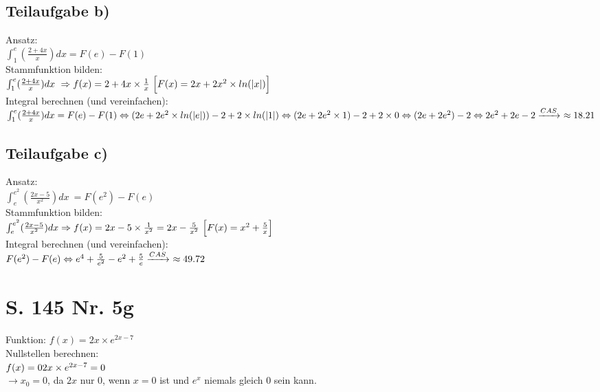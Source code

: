 \documentclass[11pt, a4paper]{report}
\begin{document}
	\section{Teilaufgabe b)}
	Ansatz:
	\\
	$\int_{1}^{e} (\frac{2 + 4x}{x}) dx = F(e) - F(1)$
	\\
	Stammfunktion bilden:
	\\
	$
	\int_{1}^{e} (\frac{2 + 4x}{x}) dx\ \Rightarrow f(x) = 2 + 4x \times \frac{1}{x}\ \Bigl[F(x) = 2x + 2x^2 \times ln(|x|)\Bigl]
	$
	\\
	Integral berechnen (und vereinfachen):
	\\
	$
	\int_{1}^{e} (\frac{2 + 4x}{x}) dx = F(e) - F(1) \\
	\Leftrightarrow (2e + 2e^2 \times ln(|e|)) - 2 + 2 \times ln(|1|) \\
	\Leftrightarrow (2e + 2e^2 \times 1) - 2 + 2 \times 0 \\
	\Leftrightarrow (2e + 2e^2) - 2 \\
	\Leftrightarrow 2e^2 + 2e - 2 \\
	\xrightarrow[]{CAS}\ \approx 18.21
	$
	\section{Teilaufgabe c)}
	Ansatz:
	\\
	$\int_{e}^{e^2} (\frac{2x - 5}{x^2}) dx\ = F(e^2) - F(e)$
	\\
	Stammfunktion bilden:
	\\
	$
	\int_{e}^{e^2} (\frac{2x - 5}{x^2}) dx \Rightarrow f(x) = 2x - 5 \times \frac{1}{x^2} = 2x - \frac{5}{x^2}\ \Bigl[F(x) = x^2 + \frac{5}{x}\Bigl]
	$
	\\
	Integral berechnen (und vereinfachen):
	\\
	$
	F(e^2) - F(e) \\
	\Leftrightarrow e^4 + \frac{5}{e^2} - e^2 + \frac{5}{e} \\
	\xrightarrow[]{CAS}\ \approx 49.72
	$
	
	\chapter{S. 145 Nr. 5g}
	Funktion: $f(x) = 2x \times e^{2x-7}$ \\
	Nullstellen berechnen: \\
	$f(x) = 0 \\
	2x \times e^{2x-7} = 0$
	\\
	$\to x_0 = 0$, da $2x$ nur $0$, wenn $x=0$ ist und $e^x$ niemals gleich $0$ sein kann.
	
\end{document}
